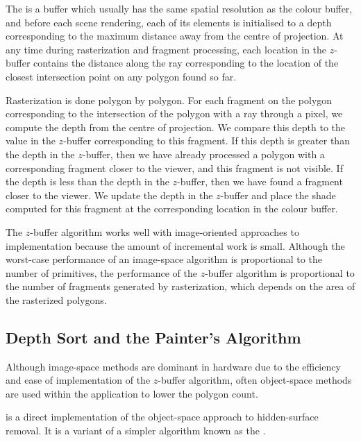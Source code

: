 \documentclass[../COS3712_Notes.tex]{subfiles}
\begin{document}
        The  is a buffer which usually has the same spatial resolution
        as the colour buffer, and before each scene rendering, each of its elements is
        initialised to a depth corresponding to the maximum distance away from the
        centre of projection.
        At any time during rasterization and fragment processing, each location in the
        $z$-buffer contains the distance along the ray corresponding to the location
        of the closest intersection point on any polygon found so far.

        Rasterization is done polygon by polygon.
        For each fragment on the polygon corresponding to the intersection of the polygon
        with a ray through a pixel, we compute the depth from the centre of projection.
        We compare this depth to the value in the $z$-buffer corresponding to this fragment.
        If this depth is greater than the depth in the $z$-buffer, then we have already
        processed a polygon with a corresponding fragment closer to the viewer,
        and this fragment is not visible.
        If the depth is less than the depth in the $z$-buffer, then we have found a fragment
        closer to the viewer.
        We update the depth in the $z$-buffer and place the shade computed for this fragment
        at the corresponding location in the colour buffer.

        The $z$-buffer algorithm works well with image-oriented approaches to implementation
        because the amount of incremental work is small.
        Although the worst-case performance of an image-space algorithm is proportional
        to the number of primitives, the performance of the $z$-buffer algorithm is proportional
        to the number of fragments generated by rasterization, which depends on the area
        of the rasterized polygons.

      \subsection{Depth Sort and the Painter's Algorithm}
        Although image-space methods are dominant in hardware due to the efficiency and ease of
        implementation of the $z$-buffer algorithm, often object-space methods are used within
        the application to lower the polygon count.

         is a direct implementation of the object-space approach
        to hidden-surface removal.
        It is a variant of a simpler algorithm known as the .
\end{document}
